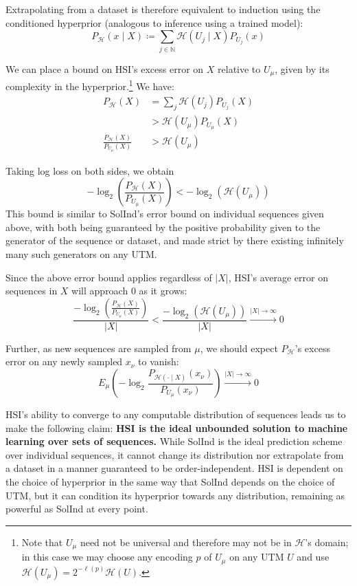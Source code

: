 \documentclass[11pt]{article}
\newcommand{\Eta}{\mathcal{H}}
\begin{document}
Extrapolating from a dataset is therefore equivalent to induction using the conditioned hyperprior (analogous to inference using a trained model):
\begin{equation}
\label{eq:hsi-dataset}
    P_\Eta(x\mid X) \coloneq \sum_{j\in\mathbb{N}} \Eta(U_j \mid X) P_{U_j}(x)
\end{equation}


We can place a bound on HSI's excess error on $X$ relative to $U_\mu$, given by its complexity in the hyperprior.\footnote{Note that $U_\mu$ need not be universal and therefore may not be in $\Eta$'s domain; in this case we may choose any encoding $p$ of $U_\mu$ on any UTM $U$ and use $\Eta(U_\mu)=2^{-\ell(p)}\Eta(U)$.} We have:
\begin{align*}
P_\Eta(X)
    &= \sum_j \Eta(U_j) P_{U_j}(X)\\
    &> \Eta(U_\mu) P_{U_\mu}(X)\\
\frac{P_\Eta(X)}{P_{U_\mu}(X)}
    &> \Eta(U_\mu)
\end{align*}


Taking log loss on both sides, we obtain
\begin{equation}
\label{eq:hsi-error-bound}
-\log_2\left(\frac{P_\Eta(X)}{P_{U_\mu}(X)}\right) < -\log_2(\Eta(U_\mu))
\end{equation}
This bound is similar to SolInd's error bound on individual sequences given above, with both being guaranteed by the positive probability given to the generator of the sequence or dataset, and made strict by there existing infinitely many such generators on any UTM.

Since the above error bound applies regardless of $|X|$, HSI's average error on sequences in $X$ will approach 0 as it grows:
\begin{equation}
\label{eq:hsi-average-error-bound}
\frac{-\log_2\left( \frac{P_\Eta(X)}{P_{U_\mu}(X)} \right)}{|X|}
    < \frac{-\log_2(\Eta(U_\mu))}{|X|} \xrightarrow{|X|\to\infty} 0
\end{equation}

Further, as new sequences are sampled from $\mu$, we should expect $P_\Eta$'s excess error on any newly sampled $x_\nu$ to vanish:
\begin{equation}
\label{eq:hsi-convergence}
    E_{\mu} \left(-\log_2 \frac{P_{\Eta(\cdot\mid X)}(x_\nu)}
    {P_{U_\mu}(x_\nu)}\right)  \xrightarrow{|X|\to\infty} 0
\end{equation}

HSI's ability to converge to any computable distribution of sequences leads us to make the following claim:
\textbf{HSI is the ideal unbounded solution to machine learning over sets of sequences.}
While SolInd is the ideal prediction scheme over individual sequences, it cannot change its distribution nor extrapolate from a dataset in a manner guaranteed to be order-independent.
HSI is dependent on the choice of hyperprior in the same way that SolInd depends on the choice of UTM, but it can condition its hyperprior towards any distribution, remaining as powerful as SolInd at every point.
\end{document}
